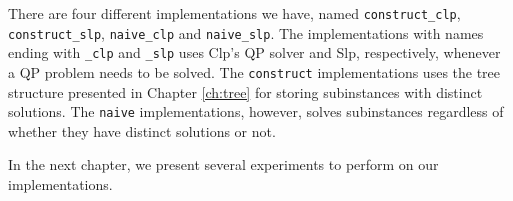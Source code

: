 There are four different implementations we have, named
\texttt{construct\_clp}, \texttt{construct\_slp}, \texttt{naive\_clp} and
\texttt{naive\_slp}. The implementations with names ending with
\texttt{\_clp} and \texttt{\_slp} uses Clp's QP solver and Slp, respectively,
whenever a QP problem needs to be solved.
The \texttt{construct} implementations uses the tree structure presented
in Chapter \ref{ch:tree} for storing subinstances with distinct solutions.
The \texttt{naive} implementations, however, solves subinstances regardless of
whether they have distinct solutions or not.

In the next chapter, we present several experiments to perform on our
implementations.

